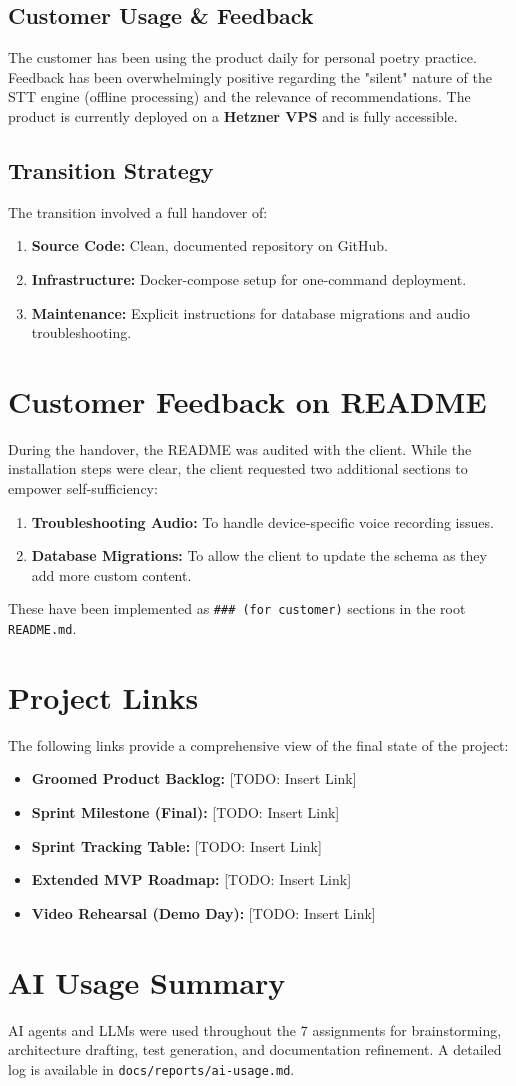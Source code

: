 \documentclass[12pt]{article}
\begin{document}
\subsection{Customer Usage \& Feedback}
The customer has been using the product daily for personal poetry practice. Feedback has been overwhelmingly positive regarding the "silent" nature of the STT engine (offline processing) and the relevance of recommendations. The product is currently deployed on a \textbf{Hetzner VPS} and is fully accessible.

\subsection{Transition Strategy}
The transition involved a full handover of:
\begin{enumerate}
    \item \textbf{Source Code:} Clean, documented repository on GitHub.
    \item \textbf{Infrastructure:} Docker-compose setup for one-command deployment.
    \item \textbf{Maintenance:} Explicit instructions for database migrations and audio troubleshooting.
\end{enumerate}

\section{Customer Feedback on README}
During the handover, the README was audited with the client. While the installation steps were clear, the client requested two additional sections to empower self-sufficiency:
\begin{enumerate}
    \item \textbf{Troubleshooting Audio:} To handle device-specific voice recording issues.
    \item \textbf{Database Migrations:} To allow the client to update the schema as they add more custom content.
\end{enumerate}
These have been implemented as \texttt{### (for customer)} sections in the root \texttt{README.md}.

\section{Project Links}
The following links provide a comprehensive view of the final state of the project:
\begin{itemize}
    \item \textbf{Groomed Product Backlog:} [TODO: Insert Link]
    \item \textbf{Sprint Milestone (Final):} [TODO: Insert Link]
    \item \textbf{Sprint Tracking Table:} [TODO: Insert Link]
    \item \textbf{Extended MVP Roadmap:} [TODO: Insert Link]
    \item \textbf{Video Rehearsal (Demo Day):} [TODO: Insert Link]
\end{itemize}

\section{AI Usage Summary}
AI agents and LLMs were used throughout the 7 assignments for brainstorming, architecture drafting, test generation, and documentation refinement. A detailed log is available in \texttt{docs/reports/ai-usage.md}.
\end{document}
